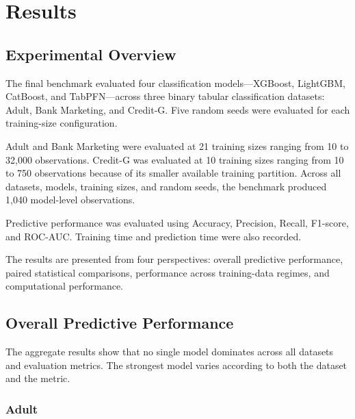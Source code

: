 \section{Results}



\subsection{Experimental Overview}



The final benchmark evaluated four classification models—XGBoost, LightGBM, CatBoost, and TabPFN—across three binary tabular classification datasets: Adult, Bank Marketing, and Credit-G. Five random seeds were evaluated for each training-size configuration.



Adult and Bank Marketing were evaluated at 21 training sizes ranging from 10 to 32,000 observations. Credit-G was evaluated at 10 training sizes ranging from 10 to 750 observations because of its smaller available training partition. Across all datasets, models, training sizes, and random seeds, the benchmark produced 1,040 model-level observations.



Predictive performance was evaluated using Accuracy, Precision, Recall, F1-score, and ROC-AUC. Training time and prediction time were also recorded.



The results are presented from four perspectives: overall predictive performance, paired statistical comparisons, performance across training-data regimes, and computational performance.



\subsection{Overall Predictive Performance}



The aggregate results show that no single model dominates across all datasets and evaluation metrics. The strongest model varies according to both the dataset and the metric.



\subsubsection{Adult}



